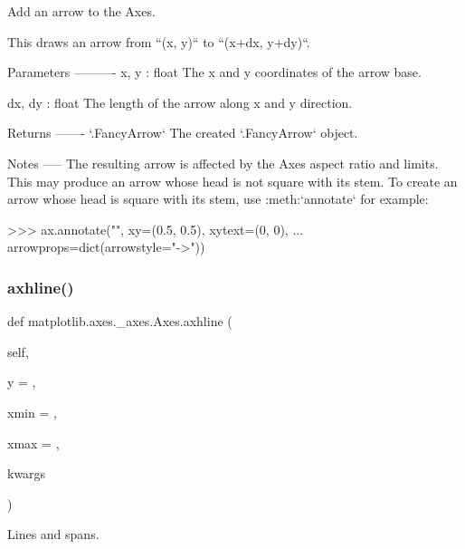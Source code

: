\begin{DoxyVerb}Add an arrow to the Axes.

This draws an arrow from ``(x, y)`` to ``(x+dx, y+dy)``.

Parameters
----------
x, y : float
    The x and y coordinates of the arrow base.

dx, dy : float
    The length of the arrow along x and y direction.


Returns
-------
`.FancyArrow`
    The created `.FancyArrow` object.

Notes
-----
The resulting arrow is affected by the Axes aspect ratio and limits.
This may produce an arrow whose head is not square with its stem. To
create an arrow whose head is square with its stem,
use :meth:`annotate` for example:

>>> ax.annotate("", xy=(0.5, 0.5), xytext=(0, 0),
...             arrowprops=dict(arrowstyle="->"))\end{DoxyVerb}
 \mbox{\label{classmatplotlib_1_1axes_1_1__axes_1_1Axes_a39d5389c184d082a7b9819f23159235a}} 
\subsubsection{\texorpdfstring{axhline()}{axhline()}}
{\footnotesize\ttfamily def matplotlib.\+axes.\+\_\+axes.\+Axes.\+axhline (\begin{DoxyParamCaption}\item[{}]{self,  }\item[{}]{y = {},  }\item[{}]{xmin = {},  }\item[{}]{xmax = {},  }\item[{}]{kwargs }\end{DoxyParamCaption})}



Lines and spans. 

